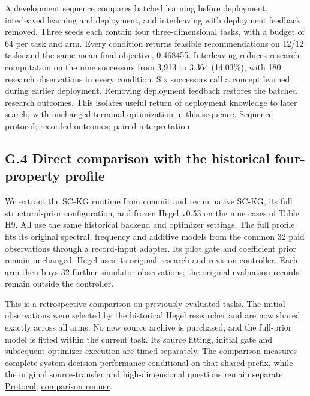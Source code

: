 \documentclass[11pt,a4paper]{article}
\begin{document}
A development sequence compares batched learning before deployment, interleaved
learning and deployment, and interleaving with deployment feedback removed.
Three seeds each contain four three-dimensional tasks, with a budget of 64 per
task and arm. Every condition returns feasible recommendations on 12/12 tasks
and the same mean final objective, 0.468455. Interleaving reduces research
computation on the nine successors from 3,913 to 3,364 (14.03\%), with 180 research
observations in every condition. Six successors call a concept learned during
earlier deployment. Removing deployment feedback restores the batched research
outcomes. This isolates useful return of deployment knowledge to later search,
with unchanged terminal optimization in this sequence.
\hyperlink{artifact-129}{Sequence protocol};
\hyperlink{artifact-130}{recorded outcomes};
\hyperlink{artifact-131}{paired interpretation}.


\subsection*{G.4 Direct comparison with the historical four-property profile}

We extract the SC-KG runtime from commit  and rerun native SC-KG,
its full structural-prior configuration, and frozen Hegel v0.53 on the nine
cases of Table H9. All use the same historical backend and optimizer settings.
The full profile fits its original spectral, frequency and additive models
from the common 32 paid observations through a record-input adapter. Its pilot
gate and coefficient prior remain unchanged. Hegel uses its original research
and revision controller. Each arm then buys 32 further simulator observations;
the original evaluation records remain outside the controller.


This is a retrospective comparison on previously evaluated tasks. The initial
observations were selected by the historical Hegel researcher and are now shared
exactly across all arms. No new source archive is purchased, and the full-prior
model is fitted within the current task. Its source fitting, initial gate and
subsequent optimizer execution are timed separately. The comparison measures
complete-system decision performance conditional on that shared prefix, while
the original source-transfer and high-dimensional questions remain separate.
\hyperlink{artifact-132}{Protocol};
\hyperlink{artifact-133}{comparison runner}.
\end{document}
